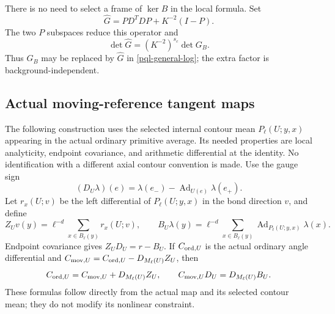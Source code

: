 There is no need to select a frame of $\ker B$ in the local formula.
Set
\begin{equation}
 \widehat G=P D^TD P+K^{-2}(I-P).
 \label{pql-full-scalar}
\end{equation}
The two $P$ subspaces reduce this operator and
\begin{equation}
 \det\widehat G=(K^{-2})^{s_c}\det G_B.
 \label{pql-scalar-completion}
\end{equation}
Thus $G_B$ may be replaced by $\widehat G$ in
\eqref{pql-general-log}; the extra factor is background-independent.

\subsection{Actual moving-reference tangent maps}
\label{pql-source-maps}

The following construction uses the selected internal contour mean
$P_\ell(U;y,x)$ appearing in the actual ordinary primitive average.
Its needed properties are local analyticity, endpoint covariance,
and arithmetic differential at the identity. No identification with
a different axial contour convention is made.
Use the gauge sign
\[
 (D_U\lambda)(e)=\lambda(e_-)
                  -\operatorname{Ad}_{U(e)}\lambda(e_+).
\]
Let $r_x(U;v)$ be the left differential of $P_\ell(U;y,x)$ in the
bond direction $v$, and define
\begin{equation}
 Z_Uv(y)=\ell^{-d}\sum_{x\in B_\ell(y)}r_x(U;v),\qquad
 B_U\lambda(y)=\ell^{-d}\sum_{x\in B_\ell(y)}
               \operatorname{Ad}_{P_\ell(U;y,x)}\lambda(x).
 \label{pql-primitive-scalar}
\end{equation}
Endpoint covariance gives
$Z_UD_U=r-B_U$. If $C_{{\rm ord},U}$ is the actual ordinary
angle differential and
$C_{{\rm mov},U}=C_{{\rm ord},U}-D_{M_\ell(U)}Z_U$, then
\begin{equation}
 C_{{\rm ord},U}=C_{{\rm mov},U}+D_{M_\ell(U)}Z_U,
 \qquad C_{{\rm mov},U}D_U=D_{M_\ell(U)}B_U.
 \label{pql-primitive-tangent}
\end{equation}
These formulas follow directly from the actual map and its selected
contour mean; they do not modify its nonlinear constraint.

